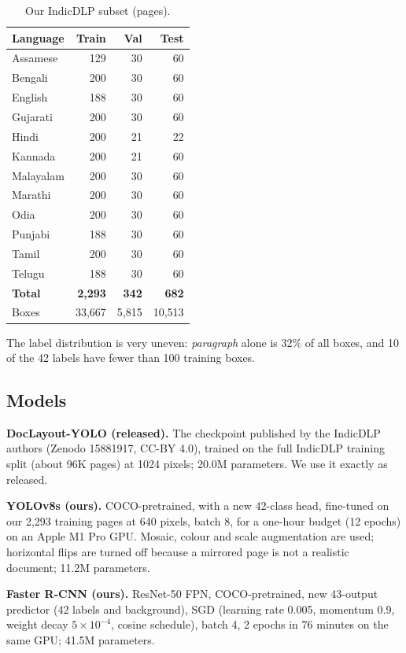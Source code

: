 \documentclass[conference]{IEEEtran}
\begin{document}
\begin{table}[t]
\centering
\caption{Our IndicDLP subset (pages).}
\label{tab:data}
\small
\begin{tabular}{lrrr}
\toprule
Language & Train & Val & Test \\
\midrule
Assamese & 129 & 30 & 60 \\
Bengali & 200 & 30 & 60 \\
English & 188 & 30 & 60 \\
Gujarati & 200 & 30 & 60 \\
Hindi & 200 & 21 & 22 \\
Kannada & 200 & 21 & 60 \\
Malayalam & 200 & 30 & 60 \\
Marathi & 200 & 30 & 60 \\
Odia & 200 & 30 & 60 \\
Punjabi & 188 & 30 & 60 \\
Tamil & 200 & 30 & 60 \\
Telugu & 188 & 30 & 60 \\
\midrule
\textbf{Total} & \textbf{2,293} & \textbf{342} & \textbf{682} \\
Boxes & 33,667 & 5,815 & 10,513 \\
\bottomrule
\end{tabular}
\end{table}

The label distribution is very uneven: \emph{paragraph} alone is 32\% of all boxes, and 10 of the
42 labels have fewer than 100 training boxes.

\subsection{Models}
\textbf{DocLayout-YOLO (released).} The checkpoint published by the IndicDLP authors (Zenodo 15881917, CC-BY 4.0),
trained on the full IndicDLP training split (about 96K pages) at 1024 pixels; 20.0M parameters. We use it
exactly as released.

\textbf{YOLOv8s (ours).} COCO-pretrained, with a new 42-class head, fine-tuned on our 2,293 training pages
at 640 pixels, batch 8, for a one-hour budget (12 epochs) on an Apple M1 Pro GPU. Mosaic, colour and scale
augmentation are used; horizontal flips are turned off because a mirrored page is not a realistic document;
11.2M parameters.

\textbf{Faster R-CNN (ours).} ResNet-50 FPN, COCO-pretrained, new 43-output predictor (42 labels and background),
SGD (learning rate 0.005, momentum 0.9, weight decay $5\times10^{-4}$, cosine schedule), batch 4, 2 epochs in 76
minutes on the same GPU; 41.5M parameters.
\end{document}
